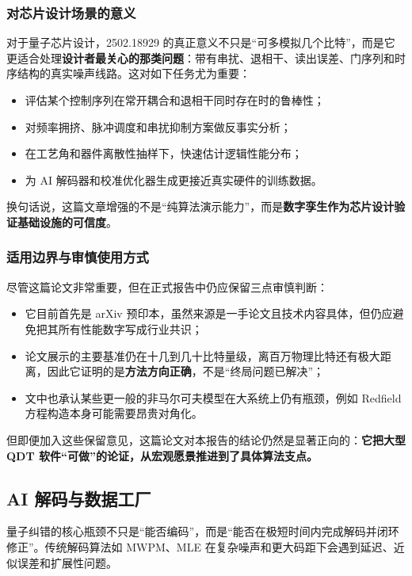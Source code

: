 \documentclass[11pt,a4paper]{article}
\begin{document}
\subsubsection{对芯片设计场景的意义}

对于量子芯片设计，2502.18929 的真正意义不只是“可多模拟几个比特”，而是它更适合处理\textbf{设计者最关心的那类问题}：带有串扰、退相干、读出误差、门序列和时序结构的真实噪声线路。这对如下任务尤为重要：

\begin{itemize}
  \item 评估某个控制序列在常开耦合和退相干同时存在时的鲁棒性；
  \item 对频率拥挤、脉冲调度和串扰抑制方案做反事实分析；
  \item 在工艺角和器件离散性抽样下，快速估计逻辑性能分布；
  \item 为 AI 解码器和校准优化器生成更接近真实硬件的训练数据。
\end{itemize}

换句话说，这篇文章增强的不是“纯算法演示能力”，而是\textbf{数字孪生作为芯片设计验证基础设施的可信度}。

\subsubsection{适用边界与审慎使用方式}

尽管这篇论文非常重要，但在正式报告中仍应保留三点审慎判断：

\begin{itemize}
  \item 它目前首先是 arXiv 预印本，虽然来源是一手论文且技术内容具体，但仍应避免把其所有性能数字写成行业共识；
  \item 论文展示的主要基准仍在十几到几十比特量级，离百万物理比特还有极大距离，因此它证明的是\textbf{方法方向正确}，不是“终局问题已解决”；
  \item 文中也承认某些更一般的非马尔可夫模型在大系统上仍有瓶颈，例如 Redfield 方程构造本身可能需要昂贵对角化。
\end{itemize}

但即便加入这些保留意见，这篇论文对本报告的结论仍然是显著正向的：\textbf{它把大型 QDT 软件“可做”的论证，从宏观愿景推进到了具体算法支点。}

\subsection{AI 解码与数据工厂}

量子纠错的核心瓶颈不只是“能否编码”，而是“能否在极短时间内完成解码并闭环修正”。传统解码算法如 MWPM、MLE 在复杂噪声和更大码距下会遇到延迟、近似误差和扩展性问题。
\end{document}
